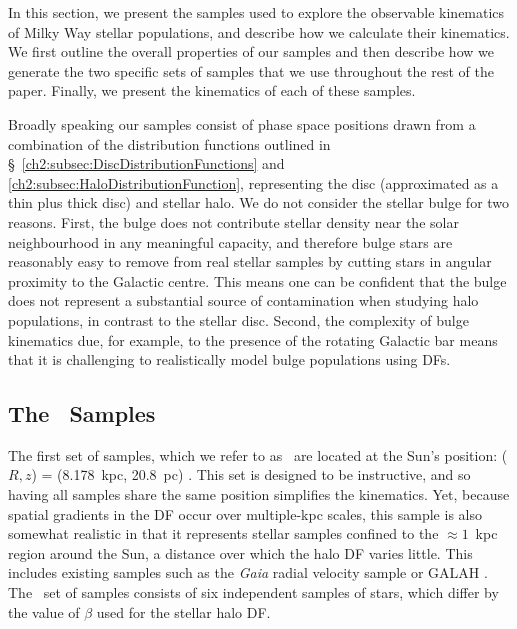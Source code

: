 In this section, we present the samples used to explore the observable kinematics of Milky Way stellar populations, and describe how we calculate their kinematics. We first outline the overall properties of our samples and then describe how we generate the two specific sets of samples that we use throughout the rest of the paper. Finally, we present the kinematics of each of these samples.

Broadly speaking our samples consist of phase space positions drawn from a combination of the distribution functions outlined in \S~\ref{ch2:subsec:DiscDistributionFunctions} and \ref{ch2:subsec:HaloDistributionFunction}, representing the disc (approximated as a thin plus thick disc) and stellar halo. We do not consider the stellar bulge for two reasons. First, the bulge does not contribute stellar density near the solar neighbourhood in any meaningful capacity, and therefore bulge stars are reasonably easy to remove from real stellar samples by cutting stars in angular proximity to the Galactic centre. This means one can be confident that the bulge does not represent a substantial source of contamination when studying halo populations, in contrast to the stellar disc. Second, the complexity of bulge kinematics due, for example, to the presence of the rotating Galactic bar means that it is challenging to realistically model bulge populations using DFs.

\subsection{The \solar\ Samples}

 The first set of samples, which we refer to as \solar\ are located at the Sun's position: ($R,z$) = (8.178~kpc, 20.8~pc) \parencite{gravity19,bennett19}. This set is designed to be instructive, and so having all samples share the same position simplifies the kinematics. Yet, because spatial gradients in the DF occur over multiple-kpc scales, this sample is also somewhat realistic in that it represents stellar samples confined to the $\approx 1$~kpc region around the Sun, a distance over which the halo DF varies little. This includes existing samples such as the \textit{Gaia} radial velocity sample \parencite[see section~3.3 in  ][ for the most recent data]{gaiaedr3} or GALAH \parencite{galah,galahdr3}. The \solar\ set of samples consists of six independent samples of stars, which differ by the value of $\beta$ used for the stellar halo DF.

